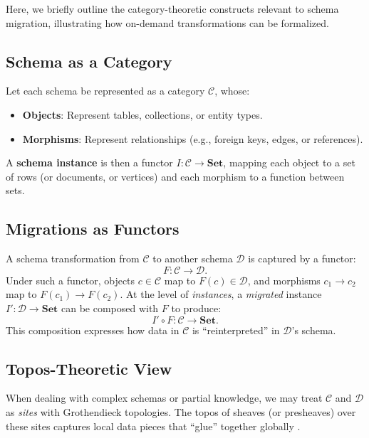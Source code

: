 \documentclass[11pt]{article}
\begin{document}
Here, we briefly outline the category-theoretic constructs relevant to schema migration, illustrating how on-demand transformations can be formalized.

\subsection{Schema as a Category}
Let each schema be represented as a category $\mathcal{C}$, whose:
\begin{itemize}
    \item \textbf{Objects}: Represent tables, collections, or entity types.
    \item \textbf{Morphisms}: Represent relationships (e.g., foreign keys, edges, or references).
\end{itemize}
A \textbf{schema instance} is then a functor $I : \mathcal{C} \to \mathbf{Set}$, mapping each object to a set of rows (or documents, or vertices) and each morphism to a function between sets.

\subsection{Migrations as Functors}
A schema transformation from $\mathcal{C}$ to another schema $\mathcal{D}$ is captured by a functor:
\begin{equation}
F: \mathcal{C} \longrightarrow \mathcal{D}.
\label{eq:functor}
\end{equation}
Under such a functor, objects $c \in \mathcal{C}$ map to $F(c) \in \mathcal{D}$, and morphisms $c_1 \to c_2$ map to $F(c_1) \to F(c_2)$. At the level of \emph{instances}, a \emph{migrated} instance $I': \mathcal{D} \to \mathbf{Set}$ can be composed with $F$ to produce:
\begin{equation}
I' \circ F : \mathcal{C} \to \mathbf{Set}.
\end{equation}
This composition expresses how data in $\mathcal{C}$ is “reinterpreted” in $\mathcal{D}$’s schema.

\subsection{Topos-Theoretic View}
When dealing with complex schemas or partial knowledge, we may treat $\mathcal{C}$ and $\mathcal{D}$ as \emph{sites} with Grothendieck topologies. The topos of sheaves (or presheaves) over these sites captures local data pieces that “glue” together globally \cite{JohnstoneSketches}.
\end{document}
